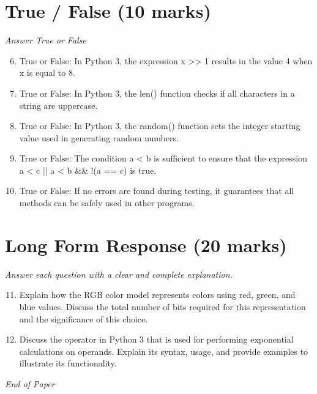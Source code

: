 \documentclass[12pt]{article}
\begin{document}
\section*{True / False (10 marks)}
\textit{Answer True or False}
\begin{enumerate}[label=\arabic*.]
\setcounter{enumi}{5}
\item True or False: In Python 3, the expression x \textgreater{}\textgreater{} 1 results in the value 4 when x is equal to 8.
\item True or False: In Python 3, the len() function checks if all characters in a string are uppercase.
\item True or False: In Python 3, the random() function sets the integer starting value used in generating random numbers.
\item True or False: The condition a \textless{} b is sufficient to ensure that the expression a \textless{} c || a \textless{} b \&\& !(a == c) is true.
\item True or False: If no errors are found during testing, it guarantees that all methods can be safely used in other programs.
\end{enumerate}

\section*{Long Form Response (20 marks)}
\textit{Answer each question with a clear and complete explanation.}
\begin{enumerate}[label=\arabic*.]
\setcounter{enumi}{10}
\item Explain how the RGB color model represents colors using red, green, and blue values. Discuss the total number of bits required for this representation and the significance of this choice.
\item Discuss the operator in Python 3 that is used for performing exponential calculations on operands. Explain its syntax, usage, and provide examples to illustrate its functionality.
\end{enumerate}

\vfill
\noindent\textit{End of Paper}
\end{document}
